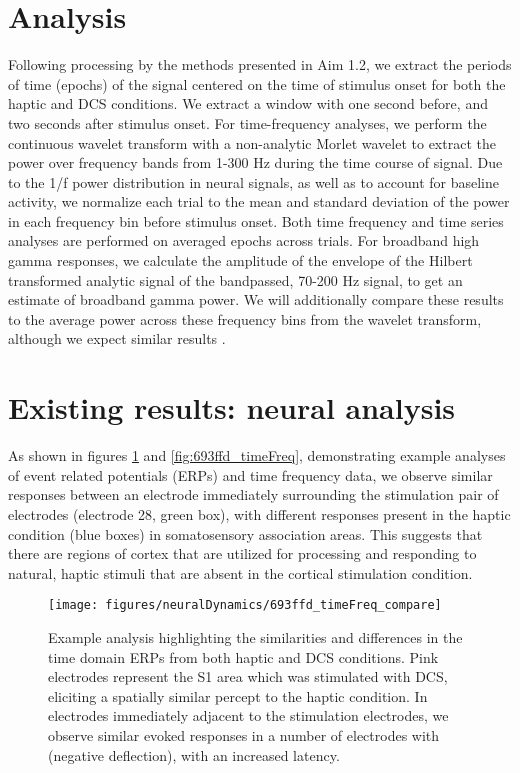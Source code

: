 \section{Analysis}

Following processing by the methods presented in Aim 1.2, we extract the periods of time (epochs) of the signal centered on the time of stimulus onset for both the haptic and DCS conditions. We extract a window with one second before, and two seconds after stimulus onset. For time-frequency analyses, we perform the continuous wavelet transform with a non-analytic Morlet wavelet to extract the power over frequency bands from 1-300 Hz during the time course of signal. Due to the 1/f power distribution in neural signals, as well as to account for baseline activity, we normalize each trial to the mean and standard deviation of the power in each frequency bin before stimulus onset. Both time frequency and time series analyses are performed on averaged epochs across trials. For broadband high gamma responses, we calculate the amplitude of the envelope of the Hilbert transformed analytic signal of the bandpassed, 70-200 Hz signal, to get an estimate of broadband gamma power. We will additionally compare these results to the average power across these frequency bins from the wavelet transform, although we expect similar results \cite{Bruns2004,VanQuyen2001}.

\section{Existing results: neural analysis}

As shown in figures \ref{fig:693ffd_temporal} and \ref{fig:693ffd_timeFreq}, demonstrating example analyses of event related potentials (ERPs) and time frequency data, we observe similar responses between an electrode immediately surrounding the stimulation pair of electrodes (electrode 28, green box), with different responses present in the haptic condition (blue boxes) in somatosensory association areas. This suggests that there are regions of cortex that are utilized for processing and responding to natural, haptic stimuli that are absent in the cortical stimulation condition. 

\begin{figure}[ht]
	\centering
	\texttt{[image: figures/neuralDynamics/693ffd\_timeFreq\_compare]}
	\caption[Time series evoked potentials comparing haptic and DCS conditions. ]{Example analysis highlighting the similarities and differences in the time domain ERPs from both haptic and DCS conditions. Pink electrodes represent the S1 area which was stimulated with DCS, eliciting a spatially similar percept to the haptic condition. In electrodes immediately adjacent to the stimulation electrodes, we observe similar evoked responses in a number of electrodes with (negative deflection), with an increased latency.}
	\label{fig:693ffd_temporal}
\end{figure}

